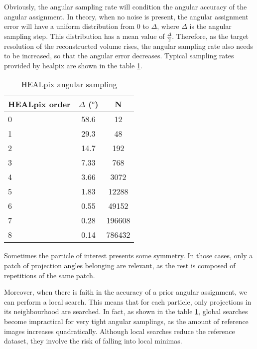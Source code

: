 \documentclass[../main.tex]{subfiles}
\begin{document}
Obviously, the angular sampling rate will condition the angular accuracy of the angular assignment. In theory, when no noise is present, the angular assignment error will have a uniform distribution from $0$ to $\Delta$, where $\Delta$ is the angular sampling step. This distribution has a mean value of $\frac{\Delta}{2}$. Therefore, as the target resolution of the reconstructed volume rises, the angular sampling rate also needs to be increased, so that the angular error decreases. Typical sampling rates provided by \gls{healpix} are shown in the table \ref{tab:3:healpix}.

\begin{table}[h]
\centering
\begin{tabular}{|l|c|c|}
\hline
HEALpix order & $\Delta$ ($\si{\degree}$) & N                           \\ \hline
0             & 58.6                      & 12                          \\ \hline
1             & 29.3                      & 48                          \\ \hline
2             & 14.7                      & 192                         \\ \hline
3             & 7.33                      & 768                         \\ \hline
4             & 3.66                      & 3072                        \\ \hline
5             & 1.83                      & 12288                       \\ \hline
6             & 0.55                      & 49152                       \\ \hline
7             & 0.28                      & 196608                      \\ \hline
8             & 0.14                      & 786432                      \\ \hline
\end{tabular}
\caption{HEALpix angular sampling}
\label{tab:3:healpix}
\end{table}


Sometimes the particle of interest presents some symmetry. In those cases, only a patch of projection angles belonging are relevant, as the rest is composed of repetitions of the same patch.

Moreover, when there is faith in the accuracy of a prior angular assignment, we can perform a local search. This means that for each particle, only projections in its neighbourhood are searched. In fact, as shown in the table \ref{tab:3:healpix}, global searches become impractical for very tight angular samplings, as the amount of reference images increases quadratically. Although local searches reduce the reference dataset, they involve the risk of falling into local minimas.
\end{document}
